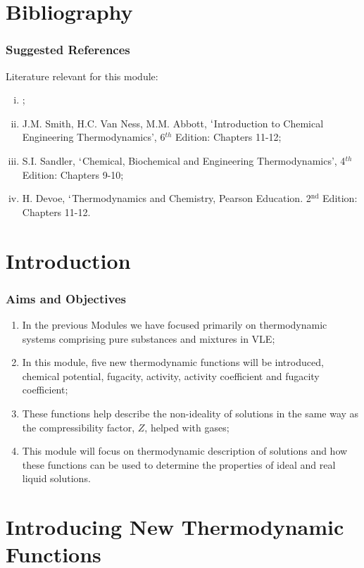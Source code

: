 \documentclass[10pt,compress,handout,ignorenonframetext,unknownkeysallowed]{beamer}
\begin{document}
\section{Bibliography}
\begin{frame}
 \frametitle{Suggested References}
  Literature relevant for this module:
  \begin{enumerate}[(i)]
   \item {};
   \item\label{SVN_Book} J.M. Smith, H.C. Van Ness, M.M. Abbott, $\lq$Introduction to Chemical Engineering Thermodynamics', 6$^{th}$ Edition: Chapters 11-12;
   \item\label{Sandle_Book} S.I. Sandler, $\lq$Chemical, Biochemical and Engineering Thermodynamics', 4$^{th}$ Edition: Chapters 9-10;
   \item H. Devoe, $\lq$Thermodynamics and Chemistry, Pearson Education. 2$^{\text{nd}}$ Edition: Chapters 11-12.
  \end{enumerate}
\end{frame}



\section{Introduction}

\begin{frame}
 \frametitle{Aims and Objectives}
    \begin{enumerate}
        \item<1-> In the previous Modules we have focused primarily on thermodynamic systems comprising pure substances and mixtures in VLE;
        \item<1-> In this module, five new thermodynamic functions will be introduced, chemical potential, fugacity, activity, activity coefficient and fugacity coefficient;
        \item<1-> These functions help describe the non-ideality of solutions in the same way as the compressibility factor, $Z$, helped with gases;
        \item<1-> This module will focus on thermodynamic description of solutions and how these functions can be used to determine the properties of ideal and real liquid solutions. 
   \end{enumerate}
\end{frame}


\section{Introducing New Thermodynamic Functions}
\end{document}
